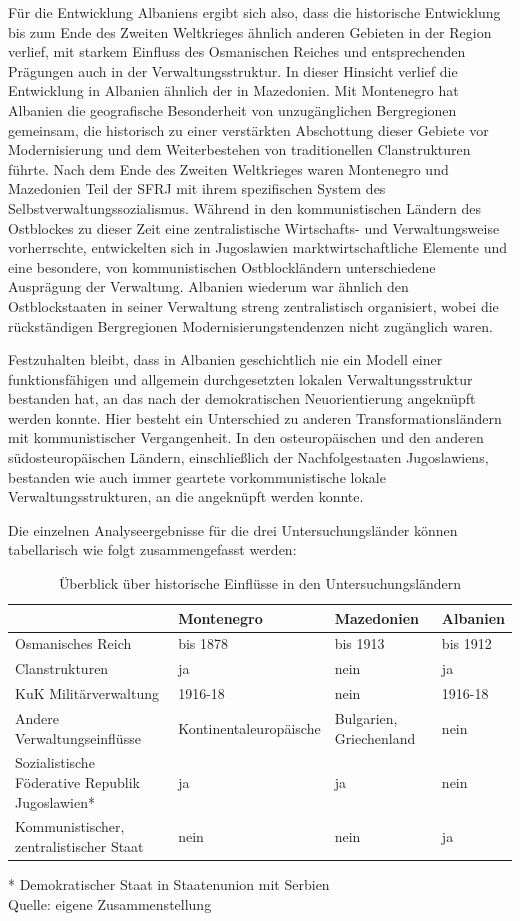 Für die Entwicklung Albaniens ergibt sich also, dass die historische Entwicklung bis zum Ende des Zweiten Weltkrieges ähnlich anderen Gebieten in der Region verlief, mit starkem Einfluss des Osmanischen Reiches und entsprechenden Prägungen auch in der Verwaltungsstruktur. In dieser Hinsicht verlief die Entwicklung in Albanien ähnlich der in Mazedonien. Mit Montenegro hat Albanien die geografische Besonderheit von unzugänglichen Bergregionen gemeinsam, die historisch zu einer verstärkten Abschottung dieser Gebiete vor Modernisierung und dem Weiterbestehen von traditionellen Clanstrukturen führte. Nach dem Ende des Zweiten Weltkrieges waren Montenegro und Mazedonien Teil der SFRJ mit ihrem spezifischen System des Selbstverwaltungssozialismus. Während in den kommunistischen Ländern des Ostblockes zu dieser Zeit eine zentralistische Wirtschafts- und Verwaltungsweise vorherrschte, entwickelten sich in Jugoslawien marktwirtschaftliche Elemente und eine besondere, von kommunistischen Ostblockländern unterschiedene Ausprägung der Verwaltung. Albanien wiederum war ähnlich den Ostblockstaaten in seiner Verwaltung streng zentralistisch organisiert, wobei die rückständigen Bergregionen Modernisierungstendenzen nicht zugänglich waren.
\par
Festzuhalten bleibt, dass in Albanien geschichtlich nie ein Modell einer funktionsfähigen und allgemein durchgesetzten lokalen Verwaltungsstruktur bestanden hat, an das nach der demokratischen Neuorientierung angeknüpft werden konnte. Hier besteht ein Unterschied zu anderen Transformationsländern mit kommunistischer Vergangenheit. In den osteuropäischen und den anderen südosteuropäischen Ländern, einschließlich der Nachfolgestaaten Jugoslawiens, bestanden wie auch immer geartete vorkommunistische lokale Verwaltungsstrukturen, an die angeknüpft werden konnte.\par
Die einzelnen Analyseergebnisse für die drei Untersuchungsländer können tabellarisch wie folgt zusammengefasst werden: 
\begin{table}[H]
\caption{Überblick über historische Einflüsse in den Untersuchungsländern }
\scriptsize{
\begin{tabular}{|R{36mm}|R{30mm}|R{30mm}|R{30mm}|}\hline
&{\bf Montenegro}&{\bf Mazedonien}&{\bf Albanien}\\\hline
Osmanisches Reich&
bis 1878&
bis 1913&
bis 1912\\\hline
Clanstrukturen &
ja&
nein&
ja\\\hline
KuK Militärverwaltung &
1916-18&
nein&
1916-18\\\hline
Andere Verwaltungseinflüsse &
Kontinentaleuropäische&
Bulgarien, Griechenland&
nein\\\hline
Sozialistische Föderative Republik Jugoslawien*&
ja&
ja&
nein\\\hline
Kommunistischer, zentralistischer Staat&
nein&
nein &
ja\\\hline
\end{tabular}\par

* Demokratischer Staat in Staatenunion mit Serbien\\
\vspace{0,5cm}
Quelle: eigene Zusammenstellung 
}
\end{table}


